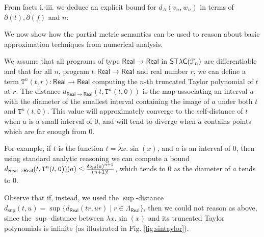 \begin{example}
\begin{itemize}
\end{itemize}

From facts i.-iii. we deduce an explicit bound for $d_{A}(v_{n},w_{n}    )$ in terms of $\partial(t), \partial(f)$ and $n$: \\

\end{example}

We now show how the partial metric semantics can be used to reason about 
basic approximation techniques from numerical analysis.  


\begin{example}

We assume that all programs of type $\mathsf{Real}\to\mathsf{Real}$ in $\mathsf{ST\lambda C}(\mathcal F_{n})$ are differentiable and that for all $n$, program $t:\mathsf{Real}\to\mathsf{Real}$ and real number $r$, we can define a term 
$\mathtt T^{n}( t, r):\mathsf{Real}\to\mathsf{Real}$ computing the $n$-th truncated Taylor polynomial of $t$ at $r$. 
The distance 
$d_{\mathsf{Real}\to\mathsf{Real}}(t, \mathtt T^{n}( t,\mathtt 0 ))$ is the map associating an interval $a$ with the diameter of the smallest interval containing the image of $a$ under both $t$ and $\mathtt T^{n}( t,\mathtt 0 )$. 
This value will approximately converge to the self-distance of $t$ when $a$ is a small interval of $0$, and will tend to diverge when $a$ contains points which are far enough from 0. 

For example, if $t$ is the function $t=\lambda x.\sin(x)$, and $a$ is an interval of $0$, then using standard analytic reasoning we can compute a bound
$d_{\mathsf{Real}\to \mathsf{Real}}(t, \mathtt T^{n}( t,\mathtt 0 ))(a  )\leq \frac{\delta_{\mathsf{Real}}(a)^{n+1}}{(n+1)!} $, which tends to $0$ as the diameter of $a$ tends to $0$.

Observe that if, instead, we used the $\sup$-distance $d_{\sup}(t,u)= \sup\{d_{\mathsf{Real}}(tr, ur)\mid r\in \Lambda_{\mathsf{Real}}\}$, then we could not reason as above, since  the $\sup$-distance between $\lambda x.\sin(x)$ and its  truncated Taylor polynomials is infinite (as illustrated in Fig. \ref{fig:sintaylor}).  

\end{example}

